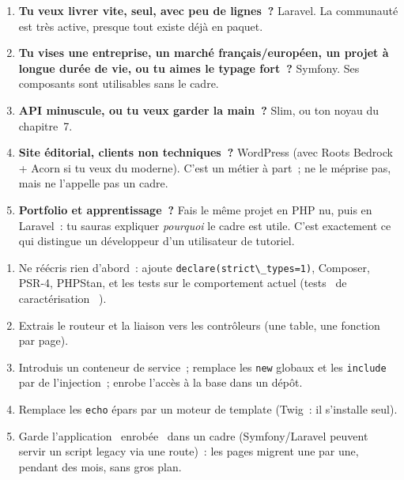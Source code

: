 \begin{enumerate}
  \item \textbf{Tu veux livrer vite, seul, avec peu de lignes~?} Laravel. La communaut\'e est tr\`es
        active, presque tout existe d\'ej\`a en paquet.
  \item \textbf{Tu vises une entreprise, un march\'e fran\c{c}ais/europ\'een, un projet \`a longue dur\'ee de
        vie, ou tu aimes le typage fort~?} Symfony. Ses composants sont utilisables sans le cadre.
  \item \textbf{API minuscule, ou tu veux garder la main~?} Slim, ou ton noyau du chapitre~7.
  \item \textbf{Site \'editorial, clients non techniques~?} WordPress (avec Roots Bedrock + Acorn si tu veux du moderne). C'est un m\'etier \`a part~; ne le m\'eprise pas, mais ne l'appelle pas un cadre.
  \item \textbf{Portfolio et apprentissage~?} Fais le m\^eme projet en PHP nu, puis en Laravel~: tu
        sauras expliquer \emph{pourquoi} le cadre est utile. C'est exactement ce qui distingue un
        d\'eveloppeur d'un utilisateur de tutoriel.
\end{enumerate}

\begin{enumerate}
  \item Ne r\'e\'ecris rien d'abord~: ajoute \verb|declare(strict\_types=1)|, Composer, PSR-4,
        PHPStan, et les tests sur le comportement actuel (tests \og ~de caract\'erisation~ \fg{}).
  \item Extrais le routeur et la liaison vers les contr\^oleurs (une table, une fonction par page).
  \item Introduis un conteneur de service~; remplace les \verb|new| globaux et les
        \verb|include| par de l'injection~; enrobe l'acc\`es \`a la base dans un d\'ep\^ot.
  \item Remplace les \verb|echo| \'epars par un moteur de template (Twig~: il s'installe seul).
  \item Garde l'application \og ~enrob\'ee~ \fg{} dans un cadre (Symfony/Laravel peuvent servir un script
        legacy via une route)~: les pages migrent une par une, pendant des mois, sans gros plan.
\end{enumerate}

